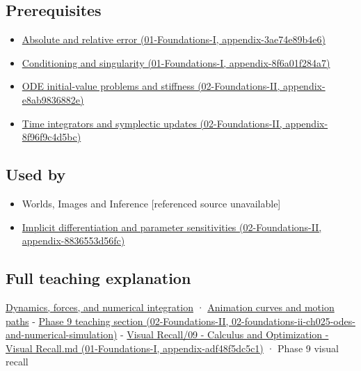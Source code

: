 \subsection{Prerequisites}\label{appendix-18eacf61a04b-prerequisites}

\begin{itemize}
\tightlist
\item
  \href{../01-Foundations-I/main.pdf\#nameddest=appendix-3ae74e89b4e6}{Absolute and relative error (01-Foundations-I, appendix-3ae74e89b4e6)}
\item
  \href{../01-Foundations-I/main.pdf\#nameddest=appendix-8f6a01f284a7}{Conditioning and singularity (01-Foundations-I, appendix-8f6a01f284a7)}
\item
  \href{../02-Foundations-II/main.pdf\#nameddest=appendix-e8ab9836882e}{ODE initial-value problems and stiffness (02-Foundations-II, appendix-e8ab9836882e)}
\item
  \href{../02-Foundations-II/main.pdf\#nameddest=appendix-8f96f9c4d5bc}{Time integrators and symplectic updates (02-Foundations-II, appendix-8f96f9c4d5bc)}
\end{itemize}

\subsection{Used by}\label{appendix-18eacf61a04b-used-by}

\begin{itemize}
\tightlist
\item
  {Worlds, Images and Inference {[}referenced source unavailable{]}}
\item
  \href{../02-Foundations-II/main.pdf\#nameddest=appendix-8836553d56fc}{Implicit differentiation and parameter sensitivities (02-Foundations-II, appendix-8836553d56fc)}
\end{itemize}

\subsection{Full teaching explanation}\label{appendix-18eacf61a04b-full-teaching-explanation}

\hyperref[04-visual-computing-ii-ch029-dynamics-forces-and-numerical-integration]{Dynamics, forces, and numerical integration} · \hyperref[04-visual-computing-ii-ch029-animation-curves-and-motion-paths]{Animation curves and motion paths} - \href{../02-Foundations-II/main.pdf\#nameddest=02-foundations-ii-ch025-odes-and-numerical-simulation}{Phase 9 teaching section (02-Foundations-II, 02-foundations-ii-ch025-odes-and-numerical-simulation)} - \href{../01-Foundations-I/main.pdf\#nameddest=appendix-adf48f5dc5c1}{Visual Recall/09 - Calculus and Optimization - Visual Recall.md (01-Foundations-I, appendix-adf48f5dc5c1)} · Phase 9 visual recall
